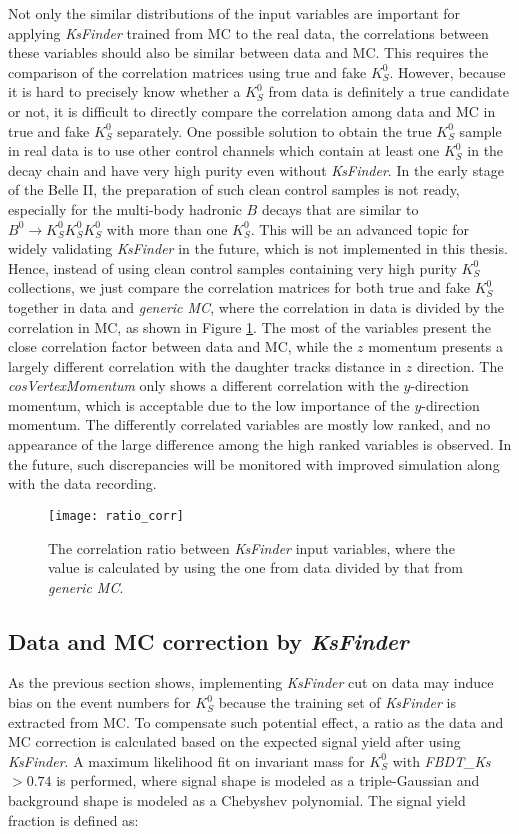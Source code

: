 Not only the similar distributions of the input variables are important for applying \textit{KsFinder} trained from MC to the real data, the correlations between these variables should also be similar between data and MC. This requires the comparison of the correlation matrices using true and fake $K_S^0$. However, because it is hard to precisely know whether a $K_S^0$ from data is definitely a true candidate or not, it is difficult to directly compare the correlation among data and MC in true and fake $K_S^0$ separately. One possible solution to obtain the true $K_S^0$ sample in real data is to use other control channels which contain at least one $K_S^0$ in the decay chain and have very high purity even without \textit{KsFinder}. In the early stage of the Belle II, the preparation of such clean control samples is not ready, especially for the multi-body hadronic $B$ decays that are similar to $B^0 \to K_S^0  K_S^0  K_S^0$ with more than one $K_S^0$. This will be an advanced topic for widely validating \textit{KsFinder} in the future, which is not implemented in this thesis.
Hence, instead of using clean control samples containing very high purity $K_S^0$ collections, we just compare the correlation matrices for both true and fake $K_S^0$ together in data and \textit{generic MC}, where the correlation in data is divided by the correlation in MC, as shown in Figure \ref{fig:ratio_corr}. The most of the variables present the close correlation factor between data and MC, while the $z$ momentum presents a largely different correlation with the daughter tracks distance in $z$ direction. The \textit{cosVertexMomentum} only shows a different correlation with the $y$-direction momentum, which is acceptable due to the low importance of the $y$-direction momentum.  The differently correlated variables are mostly low ranked, and no appearance of the large difference among the high ranked variables is observed. In the future, such discrepancies will be monitored with improved simulation along with the data recording.
\begin{figure}[htpb]
		\centering 
		\texttt{[image: ratio\_corr]}
	\caption{The correlation ratio between \textit{KsFinder} input variables, where the value is calculated by using the one from data divided by that from \textit{generic MC}.}
	\label{fig:ratio_corr}
\end{figure}


\subsection{Data and MC correction by \textit{KsFinder}}
As the previous section shows, implementing \textit{KsFinder} cut on data may induce bias on the event numbers for $K_S^0$ because the training set of \textit{KsFinder} is extracted from MC. To compensate such potential effect, a ratio as the data and MC correction is calculated based on the expected signal yield after using \textit{KsFinder}. A maximum likelihood fit on invariant mass for $K_S^0$ with \textit{FBDT\_Ks} $>0.74$ is performed, where signal shape is modeled as a triple-Gaussian and background shape is modeled as a Chebyshev polynomial. The signal yield fraction is defined as:

